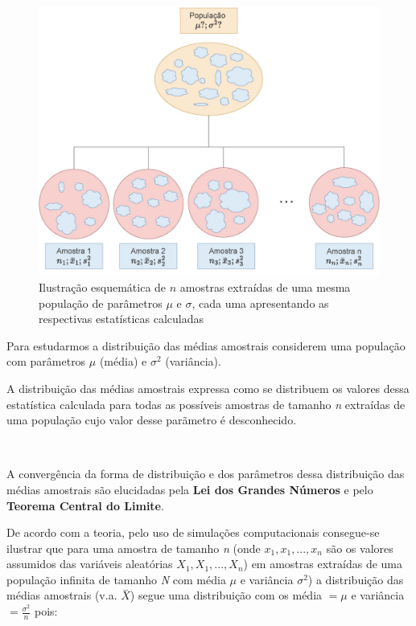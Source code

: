 \documentclass[
]{book}
\begin{document}
\hfill\break

\begin{figure}

{\centering \includegraphics[width=1\linewidth]{images9/dist_amostral_med} 

}

\caption{Ilustração esquemática de $n$ amostras extraídas de uma mesma população de parâmetros $\mu$ e $\sigma$, cada uma apresentando as respectivas estatísticas calculadas}\label{fig:fig45}
\end{figure}

\hfill\break

Para estudarmos a distribuição das médias amostrais considerem uma população com parâmetros \(\mu\) (média) e \(\sigma^{2}\) (variância).

\hfill\break

A distribuição das médias amostrais expressa como se distribuem os valores dessa estatística calculada para todas as possíveis amostras de tamanho \emph{n} extraídas de uma população cujo valor desse parãmetro é desconhecido.

~

A convergência da forma de distribuição e dos parâmetros dessa distribuição das médias amostrais são elucidadas pela \textbf{Lei dos Grandes Números} e pelo \textbf{Teorema Central do Limite}.

\hfill\break

De acordo com a teoria, pelo uso de simulações computacionais consegue-se ilustrar que para uma amostra de tamanho \emph{n} (onde \(x_{1},x_{1},...,x_{n}\) são os valores assumidos das variáveis aleatórias \(X_{1},X_{1},...,X_{n}\)) em amostras extraídas de uma população infinita de tamanho \emph{N} com média \(\mu\) e variância \(\sigma^{2}\)) a distribuição das médias amostrais (v.a. \(\stackrel{-}{X}\)) segue uma distribuição com os média \(=\mu\) e variância \(=\frac{\sigma^{2}}{n}\) pois:
\end{document}
